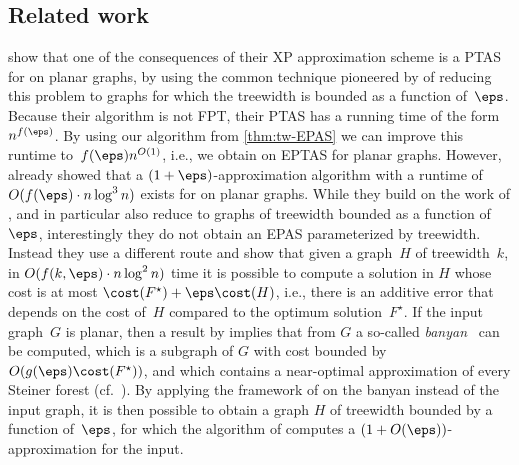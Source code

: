 %
%
%
%
%
%
%
%
%
%
%
%
%
%
%
%
%
%
%
%
%
%
%
%
%
%
%
%
%
%


%
%





\subsection{Related work}
\label{sec:related}

\citet{bateni2011approximation} show that one of the consequences of their XP
approximation scheme is a PTAS for \SF on planar graphs, by using the common
technique pioneered by \citet{baker1994approximation} of reducing this problem
to graphs for which the treewidth is bounded as a function of~$\eps$.  Because
their algorithm is not FPT, their PTAS has a running time of the form
$n^{f(\eps)}$. By using our algorithm from \autoref{thm:tw-EPAS} we can improve
this runtime to~$f(\eps)n^{O(1)}$, i.e., we obtain on EPTAS for planar graphs.
However, \citet{eisenstat2012efficient} already showed that a
$(1+\eps)$-approximation algorithm with a runtime of $O(f(\eps)\cdot n\log^3
n)$ exists for \SF on planar graphs. While they build on the work of
\citet{bateni2011approximation}, and in particular also reduce to graphs of
treewidth bounded as a function of~$\eps$, interestingly they do not obtain an
EPAS parameterized by treewidth.  Instead they use a different route and show
that given a graph~$H$ of treewidth~$k$, in $O(f(k,\eps)\cdot n\log^2 n)$ time
it is possible to compute a \SF solution in $H$ whose cost is at most
$\cost(F^\star)+\eps\cost(H)$, i.e., there is an additive error that depends on
the cost of~$H$ compared to the optimum solution~$F^\star$. If the input
graph~$G$ is planar, then a result by \citet{borradaile2009n} implies that from
$G$ a so-called \emph{banyan}~\cite{rao1998approximating, bartal2021near} can
be computed, which is a subgraph of $G$ with cost bounded by
$O(g(\eps)\cost(F^\star))$, and which contains a near-optimal approximation of
every Steiner forest (cf.~\cite[Lemma~2.1]{eisenstat2012efficient}). By
applying the framework of \citet{bateni2011approximation} on the banyan instead
of the input graph, it is then possible to obtain a graph $H$ of treewidth
bounded by a function of~$\eps$, for which the algorithm of
\citet{eisenstat2012efficient} computes a $(1+O(\eps))$-approximation for the
input. 

